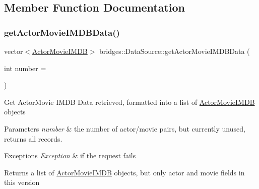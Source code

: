 \subsection{Member Function Documentation}
\mbox{\label{classbridges_1_1_data_source_a664694136550312ab3f5a82bebb91bca}} 
\subsubsection{\texorpdfstring{getActorMovieIMDBData()}{getActorMovieIMDBData()}}
{\footnotesize\ttfamily vector$<$\mbox{\hyperlink{classbridges_1_1_actor_movie_i_m_d_b}{Actor\+Movie\+I\+M\+DB}}$>$ bridges\+::\+Data\+Source\+::get\+Actor\+Movie\+I\+M\+D\+B\+Data (\begin{DoxyParamCaption}\item[{int}]{number = {} }\end{DoxyParamCaption})\hspace{0.3cm}{\ttfamily [inline]}}

Get Actor\+Movie I\+M\+DB Data retrieved, formatted into a list of \mbox{\hyperlink{classbridges_1_1_actor_movie_i_m_d_b}{Actor\+Movie\+I\+M\+DB}} objects


\begin{DoxyParams}{Parameters}
{\em number} & the number of actor/movie pairs, but currently unused, returns all records. \\
\hline
\end{DoxyParams}

\begin{DoxyExceptions}{Exceptions}
{\em Exception} & if the request fails\\
\hline
\end{DoxyExceptions}
\begin{DoxyReturn}{Returns}
a list of \mbox{\hyperlink{classbridges_1_1_actor_movie_i_m_d_b}{Actor\+Movie\+I\+M\+DB}} objects, but only actor and movie fields in this version 
\end{DoxyReturn}
\mbox{\label{classbridges_1_1_data_source_a00f0a0a1871d4864c6ccdd04195e0fb2}} 
